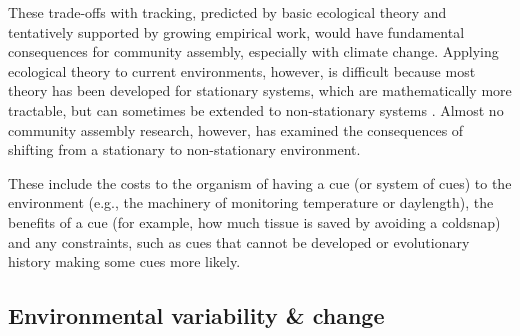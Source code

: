 \documentclass[11pt,letterpaper]{article}
\begin{document}
These trade-offs with tracking, predicted by basic ecological theory and tentatively supported by growing empirical work, would have fundamental consequences for community assembly, especially with climate change. Applying ecological theory to current environments, however, is difficult because most theory has been developed for stationary systems, which are mathematically more tractable, but can sometimes be extended to non-stationary systems \citep{chessonnonstat}. Almost no community assembly research, however, has examined the consequences of shifting from a stationary to non-stationary environment. %


These include the costs to the organism of having a cue (or system of cues) to the environment (e.g., the machinery of monitoring temperature or daylength), the benefits of a cue (for example, how much tissue is saved by avoiding a coldsnap) and any constraints, such as cues that cannot be developed or evolutionary history making some cues more likely. 




\subsection{Environmental variability \& change}
\end{document}
